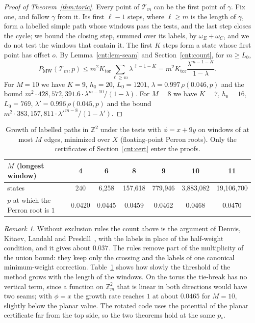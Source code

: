 \documentclass[11pt]{amsart}
\theoremstyle{definition}
\theoremstyle{remark}
\newtheorem{remark}[theorem]{Remark}
\numberwithin{equation}{section}
\newcommand{\PMW}{P_{\mathrm{MW}}}
\begin{document}
\begin{proof}[Proof of Theorem~\ref{thm:toric}]
Every point of $\mathcal T_m$ can be the first point of $\gamma$. Fix one, and follow $\gamma$ from it. Its first $\ell-1$
steps, where $\ell\ge m$ is the length of $\gamma$, form a labelled simple path whose windows pass the tests, and the
last step closes the cycle; we bound the closing step, summed over its labels, by $\omega_E+\omega_C$, and we do not
test the windows that contain it. The first $K$ steps form a state whose first point has offset $o$. By
Lemma~\ref{cnt:lem-seam} and Section~\ref{cnt:count}, for $m\ge L_0$,
\[
  \PMW(\mathcal T_m,p)\le m^2K_{\mathrm{tor}}\sum_{\ell\ge m}\lambda^{\ell-1-K}=m^2K_{\mathrm{tor}}\frac{\lambda^{m-1-K}}{1-\lambda}.
\]
For $M=10$ we have $K=9$, $h_0=20$, $L_0=1201$, $\lambda=0.997\,\rho(0.046,p)$ and the bound
$m^2\cdot428{,}572{,}391.6\cdot\lambda^{m-10}/(1-\lambda)$. For $M=8$ we have $K=7$, $h_0=16$, $L_0=769$,
$\lambda'=0.996\,\rho(0.045,p)$ and the bound $m^2\cdot383{,}157{,}811\cdot\lambda'^{\,m-8}/(1-\lambda')$.
\end{proof}

\begin{table}[ht]
\centering
\begin{tabular}{lcccccc}
\toprule
$M$ (longest window) & 4 & 6 & 8 & 9 & 10 & 11\\
\midrule
states & 240 & 6{,}258 & 157{,}618 & 779{,}946 & 3{,}883{,}082 & 19{,}106{,}700\\
$p$ at which the Perron root is $1$ & 0.0420 & 0.0445 & 0.0459 & 0.0462 & 0.0468 & 0.0470\\
\bottomrule
\end{tabular}
\caption{Growth of labelled paths in $\mathbb Z^2$ under the tests with $\phi=x+9y$ on windows of at most $M$ edges,
minimized over $X$ (floating-point Perron roots). Only the certificates of Section~\ref{cnt:cert} enter the proofs.}
\label{cnt:tab-growth}
\end{table}

\begin{remark}\label{cnt:remarks}
Without exclusion rules the count above is the argument of Dennis, Kitaev, Landahl and Preskill~\cite{DKLP02}, with the
labels in place of the half-weight condition, and it gives about $0.037$. The rules remove part of the multiplicity of
the union bound: they keep only the crossing and the labels of one canonical minimum-weight correction.
Table~\ref{cnt:tab-growth} shows how slowly the threshold of the method grows with the length of the windows. On the
torus the tie-break has no vertical term, since a function on $\mathbb Z_m^2$ that is linear in both directions would
have two seams; with $\phi=x$ the growth rate reaches $1$ at about $0.0465$ for $M=10$, slightly below the planar
value. The rotated code uses the potential of the planar certificate far from the top side, so the two theorems hold at
the same $p_\ast$.
\end{remark}
\end{document}
